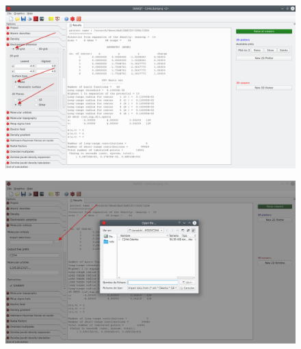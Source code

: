 \documentclass[a4paper,10pt]{article}
\begin{document}
\begin{minipage}{.5\linewidth}
\begin{figure}[H]
\caption{\label{fig:9}}
\begin{center}
\includegraphics[width=0.95\linewidth]{damqt_QS_fig9.png}
\end{center}
\end{figure} 
\end{minipage}
\begin{minipage}{.5\linewidth}
\begin{figure}[H]
\caption{\label{fig:10}}
\begin{center}
\includegraphics[width=0.95\linewidth]{damqt_QS_fig10.png}
\end{center}
\end{figure} 
\end{minipage}
\end{document}
